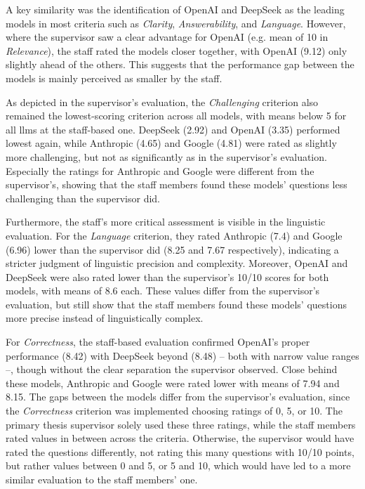 


A key similarity was the identification of OpenAI and DeepSeek as the leading models in most criteria such as \textit{Clarity}, \textit{Answerability}, and \textit{Language}. However, where the supervisor saw a clear advantage for OpenAI (e.g. mean of 10 in \textit{Relevance}), the staff rated the models closer together, with OpenAI (9.12) only slightly ahead of the others. This suggests that the performance gap between the models is mainly perceived as smaller by the staff.

As depicted in the supervisor's evaluation, the \textit{Challenging} criterion also remained the lowest-scoring criterion across all models, with means below 5 for all \ac{llms} at the staff-based one. DeepSeek (2.92) and OpenAI (3.35) performed lowest again, while Anthropic (4.65) and Google (4.81) were rated as slightly more challenging, but not as significantly as in the supervisor's evaluation. Especially the ratings for Anthropic and Google were different from the supervisor's, showing that the staff members found these models' questions less challenging than the supervisor did.

Furthermore, the staff's more critical assessment is visible in the linguistic evaluation. For the \textit{Language} criterion, they rated Anthropic (7.4) and Google (6.96) lower than the supervisor did (8.25 and 7.67 respectively), indicating a stricter judgment of linguistic precision and complexity. Moreover, OpenAI and DeepSeek were also rated lower than the supervisor's 10/10 scores for both models, with means of 8.6 each. These values differ from the supervisor's evaluation, but still show that the staff members found these models' questions more precise instead of linguistically complex.

For \textit{Correctness}, the staff-based evaluation confirmed OpenAI's proper performance (8.42) with DeepSeek beyond (8.48) -- both with narrow value ranges --, though without the clear separation the supervisor observed. Close behind these models, Anthropic and Google were rated lower with means of 7.94 and 8.15. The gaps between the models differ from the supervisor's evaluation, since the \textit{Correctness} criterion was implemented choosing ratings of 0, 5, or 10. The primary thesis supervisor solely used these three ratings, while the staff members rated values in between across the criteria. Otherwise, the supervisor would have rated the questions differently, not rating this many questions with 10/10 points, but rather values between 0 and 5, or 5 and 10, which would have led to a more similar evaluation to the staff members' one.

